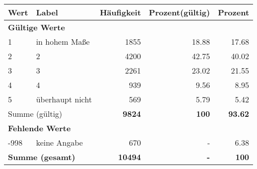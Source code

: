      \begin{longtable}{lXrrr}
     \toprule
     \textbf{Wert} & \textbf{Label} & \textbf{Häufigkeit} & \textbf{Prozent(gültig)} & \textbf{Prozent} \\
     \endhead
     \midrule
     \multicolumn{5}{l}{\textbf{Gültige Werte}}\\

     1 &
     \multicolumn{1}{X}{ in hohem Maße   } &


       \num{1855} &
       \num[round-mode=places,round-precision=2]{18.88} &
         \num[round-mode=places,round-precision=2]{17.68} \\

     2 &
     \multicolumn{1}{X}{ 2   } &


       \num{4200} &
       \num[round-mode=places,round-precision=2]{42.75} &
         \num[round-mode=places,round-precision=2]{40.02} \\

     3 &
     \multicolumn{1}{X}{ 3   } &


       \num{2261} &
       \num[round-mode=places,round-precision=2]{23.02} &
         \num[round-mode=places,round-precision=2]{21.55} \\

     4 &
     \multicolumn{1}{X}{ 4   } &


       \num{939} &
       \num[round-mode=places,round-precision=2]{9.56} &
         \num[round-mode=places,round-precision=2]{8.95} \\

     5 &
     \multicolumn{1}{X}{ überhaupt nicht   } &


       \num{569} &
       \num[round-mode=places,round-precision=2]{5.79} &
         \num[round-mode=places,round-precision=2]{5.42} \\
     \midrule
     \multicolumn{2}{l}{Summe (gültig)} &
       \textbf{\num{9824}} &
     \textbf{\num{100}} &
       \textbf{\num[round-mode=places,round-precision=2]{93.62}} \\
     \multicolumn{5}{l}{\textbf{Fehlende Werte}}\\
       -998 &
       keine Angabe &
         \num{670} &
        - &
         \num[round-mode=places,round-precision=2]{6.38} \\
     \midrule
     \multicolumn{2}{l}{\textbf{Summe (gesamt)}} &
          \textbf{\num{10494}} &
        \textbf{-} &
        \textbf{\num{100}} \\
     \bottomrule
     \end{longtable}
     
